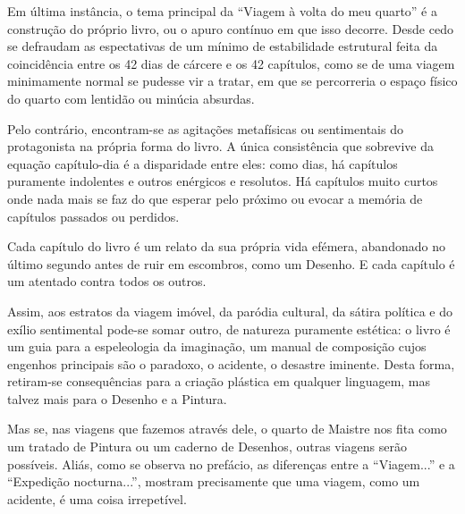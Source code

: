 \documentclass[12pt]{article}
\begin{document}
Em última instância, o tema principal da ``Viagem à volta do meu
quarto'' é a construção do próprio livro, ou o apuro contínuo em que
isso decorre. Desde cedo se defraudam as espectativas de um mínimo de
estabilidade estrutural feita da coincidência entre os 42 dias de
cárcere e os 42 capítulos, como se de uma viagem minimamente normal se
pudesse vir a tratar, em que se percorreria o espaço físico do quarto
com lentidão ou minúcia absurdas.

Pelo contrário, encontram-se as agitações metafísicas ou sentimentais
do protagonista na própria forma do livro. A única consistência que
sobrevive da equação capítulo-dia é a disparidade entre eles: como
dias, há capítulos puramente indolentes e outros enérgicos e
resolutos. Há capítulos muito curtos onde nada mais se faz do que
esperar pelo próximo ou evocar a memória de capítulos passados ou
perdidos.

Cada capítulo do livro é um relato da sua própria vida efémera,
abandonado no último segundo antes de ruir em escombros, como um
Desenho. E cada capítulo é um atentado contra todos os outros.

Assim, aos estratos da viagem imóvel, da paródia cultural, da sátira
política e do exílio sentimental pode-se somar outro, de natureza
puramente estética: o livro é um guia para a espeleologia da
imaginação, um manual de composição cujos engenhos principais são o
paradoxo, o acidente, o desastre iminente. Desta forma, retiram-se
consequências para a criação plástica em qualquer linguagem, mas
talvez mais para o Desenho e a Pintura.

Mas se, nas viagens que fazemos através dele, o quarto de Maistre nos
fita como um tratado de Pintura ou um caderno de Desenhos, outras
viagens serão possíveis. Aliás, como se observa no prefácio, as
diferenças entre a ``Viagem...'' e a ``Expedição nocturna...'',
mostram precisamente que uma viagem, como um acidente, é uma coisa
irrepetível.

\printbibliography[heading=bibliography,title={Bibliografia}]
\end{document}
